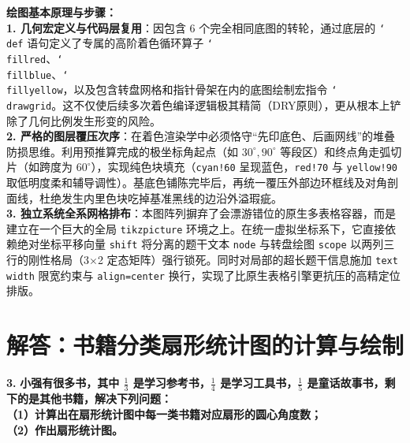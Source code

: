 \vspace{0.6cm}

{\small\color{blue!70!black}
\textbf{绘图基本原理与步骤：}\\
\textbf{1. 几何宏定义与代码层复用}：因包含 $6$ 个完全相同底图的转轮，通过底层的 \texttt{\char`\\def} 语句定义了专属的高阶着色循环算子 \texttt{\char`\\fillred}、\texttt{\char`\\fillblue}、\texttt{\char`\\fillyellow}，以及包含转盘网格和指针骨架在内的底图绘制宏指令 \texttt{\char`\\drawgrid}。这不仅使后续多次着色编译逻辑极其精简（DRY原则），更从根本上铲除了几何比例发生形变的风险。\\
\textbf{2. 严格的图层覆压次序}：在着色渲染学中必须恪守“先印底色、后画网线”的堆叠防损思维。利用预推算完成的极坐标角起点（如 $30^\circ, 90^\circ$ 等段区）和终点角走弧切片（如跨度为 $60^\circ$），实现纯色块填充（\texttt{cyan!60} 呈现蓝色，\texttt{red!70} 与 \texttt{yellow!90} 取低明度柔和辅导调性）。基底色铺陈完毕后，再统一覆压外部边环框线及对角剖面线，杜绝发生内里色块吃掉基准黑线的边沿外溢瑕疵。\\
\textbf{3. 独立系统全系网格排布}：本图阵列摒弃了会漂游错位的原生多表格容器，而是建立在一个巨大的全局 \texttt{tikzpicture} 环境之上。在统一虚拟坐标系下，它直接依赖绝对坐标平移向量 \texttt{shift} 将分离的题干文本 \texttt{node} 与转盘绘图 \texttt{scope} 以两列三行的刚性格局（3$\times$2 定态矩阵）强行锁死。同时对局部的超长题干信息施加 \texttt{text width} 限宽约束与 \texttt{align=center} 换行，实现了比原生表格引擎更抗压的高精定位排版。
}


\newpage



\newpage

\section{解答：书籍分类扇形统计图的计算与绘制}

\vspace{0.6cm}

\textbf{\LARGE 3.} \textbf{小强有很多书，其中 $\frac{1}{3}$ 是学习参考书，$\frac{1}{4}$ 是学习工具书，$\frac{1}{5}$ 是童话故事书，剩下的是其他书籍，解决下列问题：\\
（1）计算出在扇形统计图中每一类书籍对应扇形的圆心角度数；\\
（2）作出扇形统计图。}


